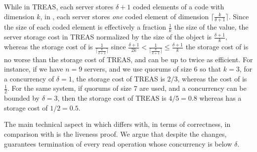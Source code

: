 While in TREAS, each server stores $\delta+1$ coded elements of a code with dimension $k$, in \treasmod{}, each server stores \emph{one} coded element of dimension ${\lceil \frac{k}{\delta+1} \rceil}$. Since the size of each coded element is effectively a fraction $\frac{1}{k}$ the size of the value, the server storage cost in TREAS normalized by the size of the object is $\frac{\delta+1}{k},$ whereas the storage cost of \treasmod{} is $\frac{1}{\lceil \frac{k}{\delta+1}\rceil}$  since 
$  \frac{\delta+1}{2 k} < \frac{1}{\lceil \frac{k}{\delta+1}\rceil} \leq \frac{\delta+1}{k}$
the storage cost of \treasmod{} is no worse than the storage cost of TREAS, and can be up to twice as efficient. For instance, if we have $n=9$ servers, and we use quorums of size $6$ so that $k=3$, for a concurrency of $\delta=1$, the storage cost of TREAS is $2/3$, whereas the cost of \treasmod{} is $\frac{1}{2}.$ For the same system, if quorums of size $7$ are used, and a concurrency can be bounded by $\delta=3$, then the storage cost of TREAS is $4/5=0.8$ whereas \treasmod{} has a storage cost of $1/2=0.5$. 

The main technical aspect in which {\treasmod} differs with, in terms of correctness, in comparison with {\treas} is the liveness proof. We argue that despite the changes, {\treasmod} guarantees termination of every read operation whose concurrency is below $\delta$.


